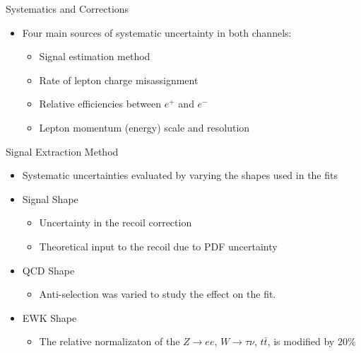 \documentclass[t, 8pt]{beamer}
\begin{document}
\begin{frame}{Systematics and Corrections}
  \begin{itemize}
    \item Four main sources of systematic uncertainty in both channels:
    \begin{itemize}
      \item Signal estimation method
      \item Rate of lepton charge misassignment
      \item Relative efficiencies between $e^{+}$ and $e^{-}$
      \item Lepton momentum (energy) scale and resolution
    \end{itemize}
  \end{itemize}
\end{frame}

\begin{frame}{Signal Extraction Method}
  \begin{itemize}
    \item Systematic uncertainties evaluated by varying the shapes used in the fits
    \item Signal Shape
    \begin{itemize}
      \item Uncertainty in the recoil correction
      \item Theoretical input to the recoil due to PDF uncertainty
    \end{itemize}
    \item QCD Shape
    \begin{itemize}
      \item Anti-selection was varied to study the effect on the fit. 
    \end{itemize}
    \item EWK Shape
    \begin{itemize}
      \item The relative normalizaton of the $Z \to ee$, $W \to \tau\nu$,
      $t\bar{t}$, is modified by $20\%$
    \end{itemize}
 \end{itemize}
\end{frame}
\end{document}
